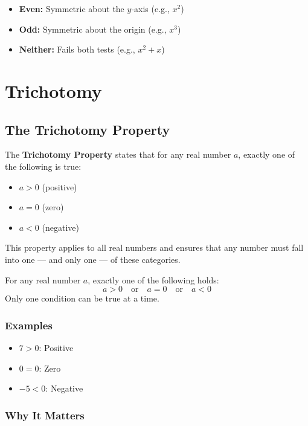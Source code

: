 \documentclass[11pt]{article}
\begin{document}
\begin{itemize}
  \item \textbf{Even:} Symmetric about the \( y \)-axis (e.g., \( x^2 \))
  \item \textbf{Odd:} Symmetric about the origin (e.g., \( x^3 \))
  \item \textbf{Neither:} Fails both tests (e.g., \( x^2 + x \))
\end{itemize}
\section{Trichotomy}

\subsection*{The Trichotomy Property}

The \textbf{Trichotomy Property} states that for any real number \( a \), exactly one of the following is true:

\begin{itemize}
  \item \( a > 0 \) (positive)
  \item \( a = 0 \) (zero)
  \item \( a < 0 \) (negative)
\end{itemize}

This property applies to all real numbers and ensures that any number must fall into one — and only one — of these categories.

\begin{tcolorbox}[colback=cyan!5!white, colframe=cyan!80!black, title=Trichotomy Summary]
For any real number \( a \), exactly one of the following holds:
\[
a > 0 \quad \text{or} \quad a = 0 \quad \text{or} \quad a < 0
\]
Only one condition can be true at a time.
\end{tcolorbox}

\subsubsection*{Examples}

\begin{itemize}
  \item \( 7 > 0 \): Positive
  \item \( 0 = 0 \): Zero
  \item \( -5 < 0 \): Negative
\end{itemize}

\subsubsection*{Why It Matters}
\end{document}
